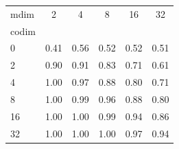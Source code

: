 \begin{tabular}{l|ccccc}
\toprule
mdim & 2 & \textcolor{blue!70!black}{4} & 8 & 16 & 32 \\
codim &  &  &  &  &  \\
\midrule
0 & 0.41 & \textcolor{blue!70!black}{0.56} & 0.52 & 0.52 & 0.51 \\
2 & 0.90 & \textcolor{blue!70!black}{0.91} & 0.83 & 0.71 & 0.61 \\
\textcolor{red!70!black}{4} & \textcolor{red!70!black}{1.00} & \textcolor{purple!70!black}{0.97} & \textcolor{red!70!black}{0.88} & \textcolor{red!70!black}{0.80} & \textcolor{red!70!black}{0.71} \\
8 & 1.00 & \textcolor{blue!70!black}{0.99} & 0.96 & 0.88 & 0.80 \\
16 & 1.00 & \textcolor{blue!70!black}{1.00} & 0.99 & 0.94 & 0.86 \\
32 & 1.00 & \textcolor{blue!70!black}{1.00} & 1.00 & 0.97 & 0.94 \\
\bottomrule
\end{tabular}
